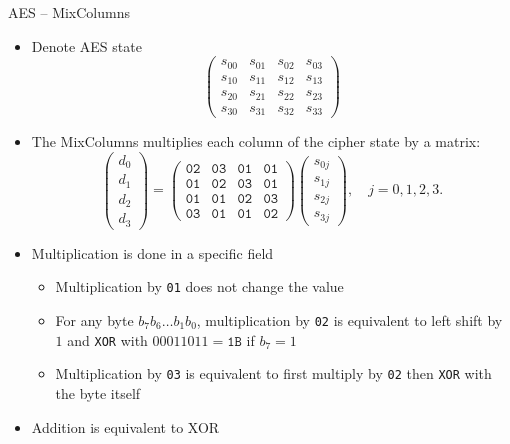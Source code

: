 \begin{frame}{AES -- MixColumns}
    \begin{itemize}
        \item Denote AES state
        \[
    \begin{pmatrix}
    s_{00} & s_{01} & s_{02} & s_{03}\\
    s_{10} & s_{11} & s_{12} & s_{13}\\
    s_{20} & s_{21} & s_{22} & s_{23}\\
    s_{30} & s_{31} & s_{32} & s_{33}
    \end{pmatrix}
    \]
    \item The MixColumns multiplies each column of the cipher state by a matrix:
\begin{equation}
    \begin{pmatrix}
    d_0\\
    d_1\\
    d_2\\
    d_3
    \end{pmatrix}
    =\begin{pmatrix}
    \texttt{02} & \texttt{03} & \texttt{01} & \texttt{01} \\
    \texttt{01} & \texttt{02} & \texttt{03} & \texttt{01} \\
    \texttt{01} & \texttt{01} & \texttt{02} & \texttt{03} \\
    \texttt{03} & \texttt{01} & \texttt{01} & \texttt{02}
    \end{pmatrix}
    \begin{pmatrix}
    s_{0j}\\
    s_{1j}\\
    s_{2j}\\
    s_{3j}
    \end{pmatrix},\quad j=0,1,2,3.
\end{equation}
\item Multiplication is done in a specific field
\begin{itemize}
    \item Multiplication by \texttt{01} does not change the value
    \item For any byte $b_7b_6\dots b_1b_0$, multiplication by \texttt{02} is equivalent to left shift by $1$ and \texttt{XOR} with $00011011=\texttt{1B}$ if $b_7=1$
    \item Multiplication by \texttt{03} is equivalent to first multiply by \texttt{02} then \texttt{XOR} with the byte itself
\end{itemize}
\item Addition is equivalent to XOR
    \end{itemize}
\end{frame}

